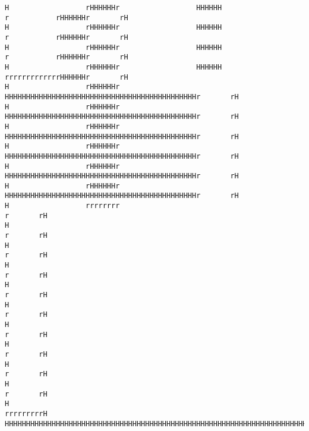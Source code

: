 \documentclass[10pt,a4paper]{article}
\begin{document}
{\begin{verbatim}
H                  rHHHHHHr                  HHHHHH                    r           rHHHHHHr       rH
H                  rHHHHHHr                  HHHHHH                    r           rHHHHHHr       rH
H                  rHHHHHHr                  HHHHHH                    r           rHHHHHHr       rH
H                  rHHHHHHr                  HHHHHH                    rrrrrrrrrrrrrHHHHHHr       rH
H                  rHHHHHHr                  HHHHHHHHHHHHHHHHHHHHHHHHHHHHHHHHHHHHHHHHHHHHHr       rH
H                  rHHHHHHr                  HHHHHHHHHHHHHHHHHHHHHHHHHHHHHHHHHHHHHHHHHHHHHr       rH
H                  rHHHHHHr                  HHHHHHHHHHHHHHHHHHHHHHHHHHHHHHHHHHHHHHHHHHHHHr       rH
H                  rHHHHHHr                  HHHHHHHHHHHHHHHHHHHHHHHHHHHHHHHHHHHHHHHHHHHHHr       rH
H                  rHHHHHHr                  HHHHHHHHHHHHHHHHHHHHHHHHHHHHHHHHHHHHHHHHHHHHHr       rH
H                  rHHHHHHr                  HHHHHHHHHHHHHHHHHHHHHHHHHHHHHHHHHHHHHHHHHHHHHr       rH
H                  rrrrrrrr                                                               r       rH
H                                                                                         r       rH
H                                                                                         r       rH
H                                                                                         r       rH
H                                                                                         r       rH
H                                                                                         r       rH
H                                                                                         r       rH
H                                                                                         r       rH
H                                                                                         r       rH
H                                                                                         r       rH
H                                                                                         rrrrrrrrrH
HHHHHHHHHHHHHHHHHHHHHHHHHHHHHHHHHHHHHHHHHHHHHHHHHHHHHHHHHHHHHHHHHHHHHHHHHHHHHHHHHHHHHHHHHHHHHHHHHHHH





\end{verbatim}}
\end{document}
